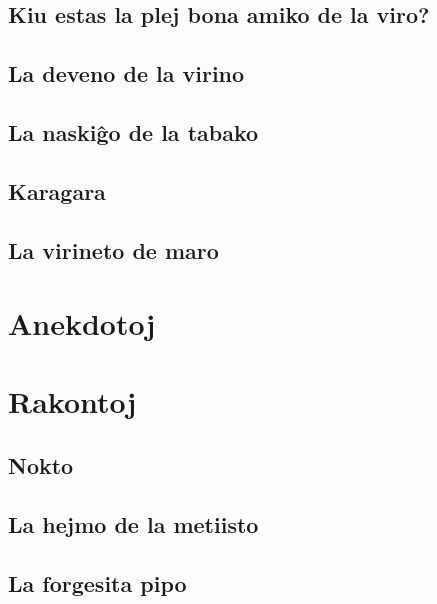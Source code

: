 \documentclass[a5paper,11pt,openany,twoside,leqno]{book}
\begin{document}
\section{Kiu estas la plej bona amiko de la viro?}
\label{plejbona}


\section{La deveno de la virino}
\label{deveno}


\section{La naski\^go de la tabako}
\label{tabako}


\section{Karagara}
\label{karagara}


\section{La virineto de maro}
\label{virineto}


%
%
\chapter{Anekdotoj}
\label{anekdotoj}


%
%
\chapter{Rakontoj}
\section{Nokto}
\label{nokto}


\section{La hejmo de la metiisto}
\label{metiisto}


\section{La forgesita pipo}
\label{pipo}

\end{document}

